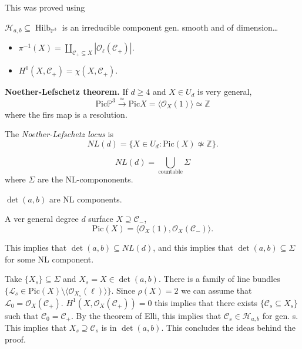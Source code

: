 \noindent
This was proved using
\begin{theorem}[Ellingsrad 75]
\label{theorem-ellin75}
$\mathcal{H}_{a,b} \subseteq
\operatorname{Hilb}_{\mathbb{P}^3}$
is an irreducible component gen. smooth
and of dimension…
\end{theorem}

\begin{proposition}
\label{proposition-duplicate-2}
\begin{itemize}
\item $\pi^{-1}(X)
=
\coprod_{\mathcal{C}_+ \subseteq X}
|\mathcal{O}_\ell(\mathcal{C}_+)|$.
\item $H^0(X,\mathcal{C}_+)
=
\chi(X,\mathcal{C}_+)$.
\end{itemize}
\end{proposition}

\medskip\noindent
{\bf Noether-Lefschetz theorem.} 
If $d \geq  4$ and $X \in U_d$
is very general,
$$
\text{Pic}\mathbb{P}^3
\xrightarrow{\simeq}
\text{Pic}X 
=
\langle \mathcal{O}_X(1)\rangle
\simeq \mathbb{Z}
$$
where the firs map is a resolution.

\begin{definition}
\label{definition-nl-locus}
The {\it Noether-Lefschetz locus} is
$$
NL(d)
=
\{ X \in U_d: \text{Pic}(X)\not\simeq
\mathbb{Z}\}.
$$
\end{definition}

\noindent
$$
NL(d) = \bigcup_{\operatorname{countable}}
\Sigma
$$
where $\Sigma$ are the NL-compononents.

\begin{theorem}[L,LH,V 24]
\label{theorem-llhv24ii}
$\det(a,b)$ are NL components.
\end{theorem}

\begin{theorem}[Lopez, 91]
\label{theorem-lopez-91}
A ver general degree $d$ surface
$X \supseteq \mathcal{C}_-$,
$$
\text{Pic}(X) = 
\langle \mathcal{O}_X(1),
\mathcal{O}_X(\mathcal{C}_-)\rangle.
$$
\end{theorem}

\noindent
This implies that $\det(a,b) \subseteq
NL(d)$,
and this implies that
$\det(a,b) \subseteq \Sigma$ for some
NL component.

Take $\{ X_s\} \subseteq \Sigma$
and $X_s = X \in \det(a,b)$.
There is a family of line bundles
$\{\mathcal{L}_s \in \text{Pic}(X)\setminus
\langle\mathcal{O}_{X_s}(\ell)\rangle\}$.
Since $\rho(X) = 2$ we can assume that
$\mathcal{L}_0 =
\mathcal{O}_X(\mathcal{C}_+)$.
$H^1(X,\mathcal{O}_X(\mathcal{C}_+))=0$
this implies that there exists
$\{\mathcal{C}_s \subseteq X_s\}$ such that
$\mathcal{C}_0 = \mathcal{C}_{+}$.
By the theorem of Elli, this implies that
$\mathcal{C}_s \in \mathcal{H}_{a,b}$ for
gen. s. This implies that
$X_s \supseteq \mathcal{C}_s$ is in 
$\det(a,b)$. This concludes the ideas
behind the proof.

